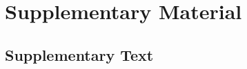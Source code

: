 \documentclass[11pt]{article}
\begin{document}
\clearpage

\section*{Supplementary Material}
\makeatletter
\setcounter{figure}{0}
\setcounter{table}{0}
\renewcommand{\thefigure}{S\@arabic\c@figure}
\renewcommand{\thetable}{S\@arabic\c@table}
\makeatother

\subsection*{Supplementary Text}
\end{document}
